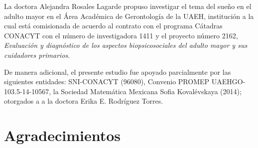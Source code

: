 \documentclass[12pt,letterpaper]{book}
\begin{document}

\newpage

La doctora Alejandra Rosales Lagarde propuso investigar el tema del sueño en el adulto mayor en el
Área Académica de Gerontología de la UAEH, institución a la cual está comisionada de acuerdo al 
contrato con el programa Cátadras CONACYT con el número de investigadora 1411 y el proyecto número 
2162, \textit{Evaluación y diagnóstico de los aspectos biopsicosociales del adulto mayor y sus 
cuidadores primarios}. 
%

De manera adicional, el presente estudio fue apoyado parcialmente por las siguientes entidades: 
SNI-CONACYT (96080), Convenio PROMEP UAEHGO-103.5-14-10567, la Sociedad Matemática Mexicana Sofia 
Kovalévskaya (2014); otorgados a a la doctora Erika E. Rodríguez Torres.

\newpage


\chapter*{Agradecimientos}
\end{document}
